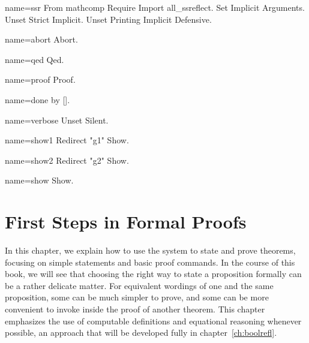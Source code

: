 \begin{coqdef}{name=ssr}
From mathcomp Require Import all_ssreflect.
Set Implicit Arguments.
Unset Strict Implicit.
Unset Printing Implicit Defensive.
\end{coqdef}
\begin{coqdef}{name=abort}
Abort.
\end{coqdef}
\begin{coqdef}{name=qed}
Qed.
\end{coqdef}
\begin{coqdef}{name=proof}
Proof.
\end{coqdef}
\begin{coqdef}{name=done}
by [].
\end{coqdef}
\begin{coqdef}{name=verbose}
Unset Silent.
\end{coqdef}
\begin{coqdef}{name=show1}
Redirect "g1" Show.
\end{coqdef}
\begin{coqdef}{name=show2}
Redirect "g2" Show.
\end{coqdef}
\begin{coqdef}{name=show}
Show.
\end{coqdef}


\chapter{First Steps in Formal Proofs}{}
\label{ch:proofs}

In this chapter, we explain how to use the \Coq{} system to state and
prove theorems, focusing on simple statements and basic proof
commands. In the course of this book, we will see that choosing the
right way to state a proposition formally can be a rather delicate
matter. For equivalent wordings of one and the same
proposition, some can be
much simpler to prove, and some can be more convenient to invoke
inside the proof of another theorem. This chapter emphasizes
the use of computable definitions and equational reasoning
whenever possible, an approach that will be developed fully in
chapter~\ref{ch:boolrefl}.

